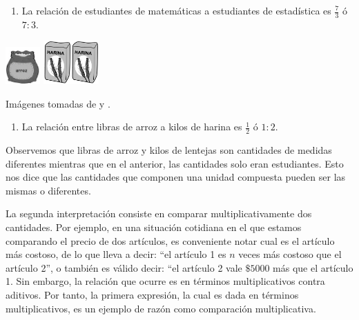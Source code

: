 \documentclass[
]{book}
\providecommand{\tightlist}{%
  \setlength{\itemsep}{0pt}\setlength{\parskip}{0pt}}
\begin{document}
\begin{enumerate}
\def\labelenumi{\arabic{enumi}.}
\setcounter{enumi}{1}
\tightlist
\item
  La relación de estudiantes de matemáticas a estudiantes de estadística es \(\frac{7}{3}\) ó \(7:3\).
\end{enumerate}

\includegraphics[width=0.52083in,height=\textheight]{ProtectoR/arroz.png} \includegraphics[width=0.41667in,height=\textheight]{ProtectoR/harina.png}\includegraphics[width=0.41667in,height=\textheight]{ProtectoR/harina.png}

Imágenes tomadas de \citet{BibEntry2021Marzo} y \citet{BibEntry2019Mar}.

\begin{enumerate}
\def\labelenumi{\arabic{enumi}.}
\setcounter{enumi}{2}
\tightlist
\item
  La relación entre libras de arroz a kilos de harina es \(\frac{1}{2}\) ó \(1:2\).
\end{enumerate}

Observemos que libras de arroz y kilos de lentejas son cantidades de medidas diferentes mientras que en el anterior, las cantidades solo eran estudiantes. Esto nos dice que las cantidades que componen una unidad compuesta pueden ser las mismas o diferentes.

La segunda interpretación consiste en comparar multiplicativamente dos cantidades. Por ejemplo, en una situación cotidiana en el que estamos comparando el precio de dos artículos, es conveniente notar cual es el artículo más costoso, de lo que lleva a decir: ``el artículo 1 es \(n\) veces más costoso que el artículo 2'', o también es válido decir: ``el artículo 2 vale \(\$5000\) más que el artículo 1. Sin embargo, la relación que ocurre es en términos multiplicativos contra aditivos. Por tanto, la primera expresión, la cual es dada en términos multiplicativos, es un ejemplo de razón como comparación multiplicativa.
\end{document}
